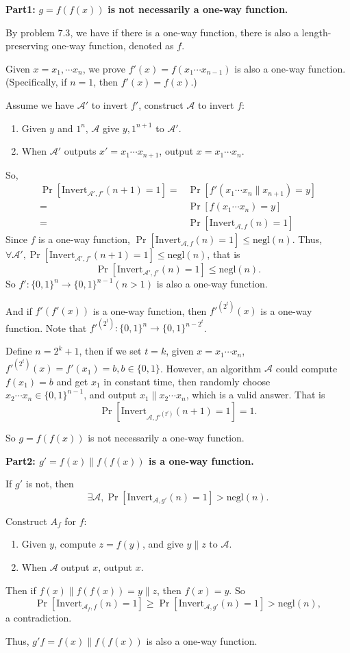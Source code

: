 \documentclass[a4paper]{article}
\newcommand{\negl}{\text{negl}}
\newcommand{\Invert}{\text{Invert}}
\newcommand{\A}{\mathcal{A}}
\newenvironment{problem}[2][Problem]{\begin{trivlist}
\item[\hskip \labelsep {\bfseries #1}\hskip \labelsep {\bfseries #2.}]}{\end{trivlist}}
\begin{document}
\begin{problem}{7.8}
\textbf{Part1:} $g=f(f(x))$ \textbf{is not necessarily a one-way function.}\par
By problem $7.3$, we have if there is a one-way function, there is also a length-preserving one-way function, denoted as $f$. \par
Given $x=x_1,\cdots x_n$, we prove $f'(x)=f(x_1\cdots x_{n-1})$ is also a one-way function.(Specifically, if $n=1$, then $f'(x)=f(x)$.)\par Assume we have $\A'$ to invert $f'$, construct $\A$ to invert $f$:
\begin{enumerate}
    \item Given $y$ and $1^n$, $\A$ give $y,1^{n+1}$ to $\A'$.
    \item When $\A'$ outputs $x'=x_1\cdots x_{n+1}$, output $x=x_1\cdots x_n$.
\end{enumerate}
So,
\begin{align*}
    \Pr[\Invert_{\A',f'}(n+1)=1]=&\Pr[f'(x_1\cdots x_{n}\|x_{n+1})=y]\\
    =&\Pr[f(x_1\cdots x_{n})=y]\\
    =&\Pr[\Invert_{\A,f}(n)=1]
\end{align*}
Since $f$ is a one-way function, $\Pr[\Invert_{\A,f}(n)=1]\le\negl(n)$.
Thus, $\forall \A', \Pr[\Invert_{\A',f'}(n+1)=1]\le\negl(n)$, that is \[\Pr[\Invert_{\A',f'}(n)=1]\le\negl(n).\]
So $f':\{0,1\}^n\rightarrow\{0,1\}^{n-1}(n>1)$ is also a one-way function.\par
And if $f'(f'(x))$ is a one-way function, then $f'^{(2^t)}(x)$ is a one-way function. Note that $f'^{(2^t)}:\{0,1\}^n\rightarrow\{0,1\}^{n-2^t}$.\par
Define $n=2^k+1$, then if we set $t=k$, given $x=x_1\cdots x_n$, $f'^{(2^t)}(x)=f'(x_1)=b,b\in\{0,1\}$. However, an algorithm $\A$ could compute $f(x_1)=b$ and get $x_1$ in constant time, then randomly choose $x_2\cdots x_n\in\{0,1\}^{n-1}$, and output $x_1\|x_2\cdots x_n$, which is a valid answer. That is $$\Pr[\Invert_{\A,f'^{(2^t)}}(n+1)=1]=1.$$\par
So $g=f(f(x))$ is not necessarily a one-way function.\par\vspace{3ex}

\textbf{Part2: $g'=f(x)\|f(f(x))$ is a one-way function.} \par
If $g'$ is not, then \[\exists \A, \Pr[\Invert_{\A,g'}(n)=1]>\negl(n).\]\par
Construct $A_f$ for $f$:
\begin{enumerate}
    \item Given $y$, compute $z=f(y)$, and give $y\|z$ to $\A$.
    \item When $\A$ output $x$, output $x$.
\end{enumerate}\par
Then if $f(x)\|f(f(x))=y\|z$, then $f(x)=y$. So \[\Pr[\Invert_{\A_f,f}(n)=1]\ge\Pr[\Invert_{\A,g'}(n)=1]>\negl(n),\]
a contradiction.\par
Thus, $g'f=f(x)\|f(f(x))$ is also a one-way function. \par
\end{problem}
\end{document}
